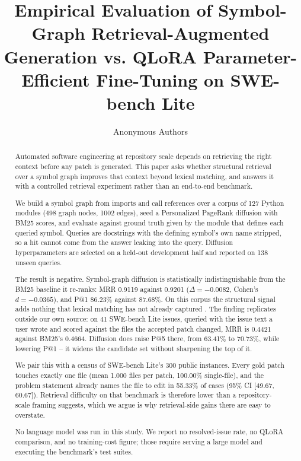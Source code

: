 \documentclass[10pt,twocolumn,letterpaper]{article}
\begin{document}
\title{Empirical Evaluation of Symbol-Graph Retrieval-Augmented Generation vs. QLoRA Parameter-Efficient Fine-Tuning on SWE-bench Lite}

\author{
Anonymous Authors
}

\maketitle

\begin{abstract}
Automated software engineering at repository scale depends on retrieving the right context before any patch is generated. This paper asks whether structural retrieval over a symbol graph improves that context beyond lexical matching, and answers it with a controlled retrieval experiment rather than an end-to-end benchmark.

We build a symbol graph from imports and call references over a corpus of 127 Python modules (498 graph nodes, 1002 edges), seed a Personalized PageRank diffusion with BM25 scores, and evaluate against ground truth given by the module that defines each queried symbol. Queries are docstrings with the defining symbol's own name stripped, so a hit cannot come from the answer leaking into the query. Diffusion hyperparameters are selected on a held-out development half and reported on 138 unseen queries.

The result is negative. Symbol-graph diffusion is statistically indistinguishable from the BM25 baseline it re-ranks: MRR 0.9119 against 0.9201 ($\Delta = -0.0082$, Cohen's $d = -0.0365$), and P@1 86.23\% against 87.68\%. On this corpus the structural signal adds nothing that lexical matching has not already captured \cite{arxiv_2501_02497}. The finding replicates outside our own source: on 41 SWE-bench Lite issues, queried with the issue text a user wrote and scored against the files the accepted patch changed, MRR is 0.4421 against BM25's 0.4664. Diffusion does raise P@5 there, from 63.41\% to 70.73\%, while lowering P@1 -- it widens the candidate set without sharpening the top of it.

We pair this with a census of SWE-bench Lite's 300 public instances. Every gold patch touches exactly one file (mean 1.000 files per patch, 100.00\% single-file), and the problem statement already names the file to edit in 55.33\% of cases (95\% CI [49.67, 60.67]). Retrieval difficulty on that benchmark is therefore lower than a repository-scale framing suggests, which we argue is why retrieval-side gains there are easy to overstate.

No language model was run in this study. We report no resolved-issue rate, no QLoRA comparison, and no training-cost figure; those require serving a large model and executing the benchmark's test suites.
\end{abstract}
\end{document}
